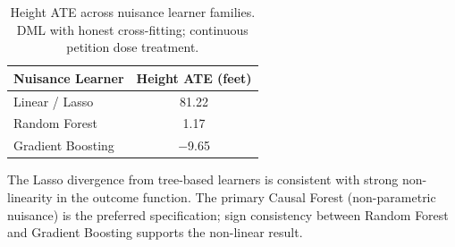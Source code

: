 \begin{table}[H]
\centering
\caption[Nuisance Model Sensitivity (Height ATE)]{Height ATE across nuisance learner families. DML with honest cross-fitting; continuous petition dose treatment.}
\label{tab:nuisance_sensitivity}
\begin{tabular}{lc}
\toprule
\textbf{Nuisance Learner} & \textbf{Height ATE (feet)} \\
\midrule
Linear / Lasso       & \phantom{$-$}81.22 \\
Random Forest        & \phantom{$-$}1.17  \\
Gradient Boosting    & $-$9.65            \\
\bottomrule
\end{tabular}
\par\smallskip
\footnotesize The Lasso divergence from tree-based learners is consistent with strong non-linearity in the outcome function. The primary Causal Forest (non-parametric nuisance) is the preferred specification; sign consistency between Random Forest and Gradient Boosting supports the non-linear result.
\end{table}

